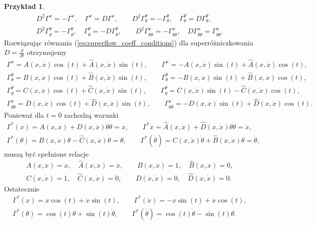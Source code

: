 \documentclass[11pt,a4paper]{report}
\theoremstyle{definition}
\newtheorem{example}[theorem]{Przykład}
\begin{document}
\begin{example}
\begin{equation}
\begin{gathered}
D^2\Gamma^x=-\Gamma^x,\quad \Gamma^{\dot x}=D\Gamma^x,\qquad
D^2\Gamma^\theta_{\theta}=-\Gamma^\theta_{\theta},\quad \Gamma^{\dot\theta}_{\theta}=D\Gamma^{\theta}_{\theta},\\
D^2\Gamma^{\dot\theta}_{\dot \theta}=-\Gamma^{\dot\theta}_{\dot\theta},\quad \Gamma^{\theta}_{\dot\theta}=-D\Gamma^{\dot\theta}_{\dot\theta},\qquad
D^2\Gamma^x_{\theta\dot\theta}=-\Gamma^x_{\theta\dot \theta},\quad D\Gamma^{x}_{\theta\dot\theta}=\Gamma^{\dot x}_{\theta\dot\theta}.
\end{gathered}
\end{equation}
Rozwiązując równania (\ref{eq:superflow_coeff_conditions}) dla superróżniczkowania $D = \frac{\partial}{\partial t}$ otrzymujemy
\begin{equation}
\begin{gathered}
\Gamma^x =A(x,\dot x)\cos (t)+\hat A(x,\dot x)\sin(t),\qquad  \Gamma^{\dot x}=-A(x,\dot x)\sin (t)+\hat A(x,\dot x)\cos(t),\\
\Gamma^\theta_\theta =B(x,\dot x)\cos (t)+\hat B(x,\dot x)\sin(t),\qquad \Gamma^{\dot \theta}_\theta=-B(x,\dot x)\sin (t)+\hat B(x,\dot x)\cos(t),\\
\Gamma^{\dot \theta}_{\dot \theta} =C(x,\dot x)\cos (t)+\hat C(x,\dot x)\sin(t),\qquad \Gamma^{\theta}_{\dot \theta}=C(x,\dot x)\sin (t)-\hat C(x,\dot x)\cos(t),\\
\Gamma^x_{\theta\dot\theta} =D(x,\dot x)\cos (t)+\hat D(x,\dot x)\sin(t),\qquad  \Gamma^{\dot x}_{\theta\dot\theta}=-D(x,\dot x)\sin (t)+\hat D(x,\dot x)\cos(t).
\end{gathered}
\end{equation}
Ponieważ dla $t=0$ zachodzą warunki
\begin{equation*}
\begin{gathered}
\Gamma^*(x)=A(x,\dot x)+D(x,\dot x)\theta\dot\theta=x,\qquad\Gamma^*\dot x=\hat A(x,\dot x)+\hat D(x,\dot x)\theta\dot\theta=\dot x,\quad\\
\Gamma^*(\theta)=B(x,\dot x)\theta-\hat C(x,\dot x)\dot\theta=\theta,\qquad
\Gamma^*(\dot \theta)=C(x,\dot x)\dot\theta+\hat B(x,\dot x)\theta=\dot\theta,
\end{gathered}
\end{equation*}
muszą być spełnione relacje
\begin{equation*}
\begin{gathered}
A(x,\dot x)=x,\quad \hat A(x,\dot x)=\dot x, \qquad B(x,\dot x)=1, \quad \hat B(x,\dot x)=0, \\ C(x,\dot x)=1, \quad \hat C(x,\dot x)=0, \qquad D(x,\dot x)=0, \quad \hat D(x,\dot x)=0.
\end{gathered}
\end{equation*}
Ostatecznie
\begin{equation*}
\begin{gathered}\Gamma^*(x)=x\cos(t)+\dot x\sin(t),\qquad\Gamma^*(\dot x)=-x\sin(t)+\dot x\cos(t),\\
\Gamma^*(\theta)=\cos(t)\theta+\sin(t)\dot\theta,\qquad
\Gamma^*(\dot \theta)=\cos(t)\dot\theta-\sin(t)\theta.
\end{gathered}
\end{equation*}


\end{example}
\end{document}
